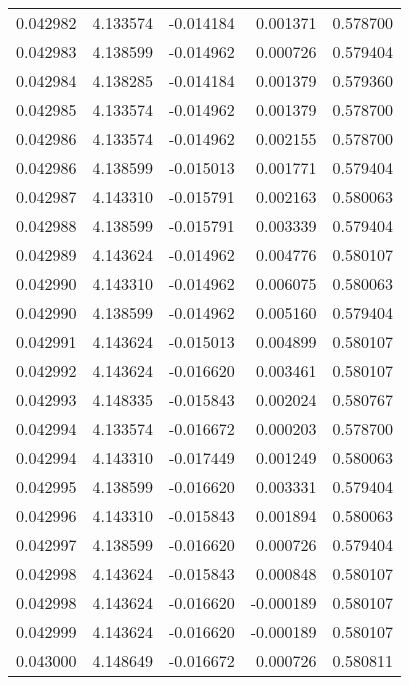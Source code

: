 \begin{tabular}{lrrrr}
0.042982    &  4.133574 & -0.014184 &  0.001371 &             0.578700 \\
0.042983    &  4.138599 & -0.014962 &  0.000726 &             0.579404 \\
0.042984    &  4.138285 & -0.014184 &  0.001379 &             0.579360 \\
0.042985    &  4.133574 & -0.014962 &  0.001379 &             0.578700 \\
0.042986    &  4.133574 & -0.014962 &  0.002155 &             0.578700 \\
0.042986    &  4.138599 & -0.015013 &  0.001771 &             0.579404 \\
0.042987    &  4.143310 & -0.015791 &  0.002163 &             0.580063 \\
0.042988    &  4.138599 & -0.015791 &  0.003339 &             0.579404 \\
0.042989    &  4.143624 & -0.014962 &  0.004776 &             0.580107 \\
0.042990    &  4.143310 & -0.014962 &  0.006075 &             0.580063 \\
0.042990    &  4.138599 & -0.014962 &  0.005160 &             0.579404 \\
0.042991    &  4.143624 & -0.015013 &  0.004899 &             0.580107 \\
0.042992    &  4.143624 & -0.016620 &  0.003461 &             0.580107 \\
0.042993    &  4.148335 & -0.015843 &  0.002024 &             0.580767 \\
0.042994    &  4.133574 & -0.016672 &  0.000203 &             0.578700 \\
0.042994    &  4.143310 & -0.017449 &  0.001249 &             0.580063 \\
0.042995    &  4.138599 & -0.016620 &  0.003331 &             0.579404 \\
0.042996    &  4.143310 & -0.015843 &  0.001894 &             0.580063 \\
0.042997    &  4.138599 & -0.016620 &  0.000726 &             0.579404 \\
0.042998    &  4.143624 & -0.015843 &  0.000848 &             0.580107 \\
0.042998    &  4.143624 & -0.016620 & -0.000189 &             0.580107 \\
0.042999    &  4.143624 & -0.016620 & -0.000189 &             0.580107 \\
0.043000    &  4.148649 & -0.016672 &  0.000726 &             0.580811 \\

\end{tabular}
